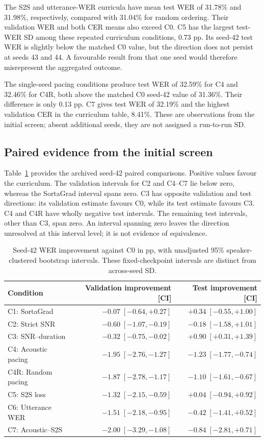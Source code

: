 \documentclass[12pt,a4paper]{report}
\begin{document}
The S2S and utterance-WER curricula have mean test WER of 31.78\% and 31.98\%, respectively, compared with 31.04\% for random ordering. Their validation WER and both CER means also exceed C0. C5 has the largest test-WER SD among these repeated curriculum conditions, 0.73 pp. Its seed-42 test WER is slightly below the matched C0 value, but the direction does not persist at seeds 43 and 44. A favourable result from that one seed would therefore misrepresent the aggregated outcome.

The single-seed pacing conditions produce test WER of 32.59\% for C4 and 32.46\% for C4R, both above the matched C0 seed-42 value of 31.36\%. Their difference is only 0.13 pp. C7 gives test WER of 32.19\% and the highest validation CER in the curriculum table, 8.41\%. These are observations from the initial screen; absent additional seeds, they are not assigned a run-to-run SD.

\subsection{Paired evidence from the initial screen}

Table~\ref{tab:results-bootstrap} provides the archived seed-42 paired comparisons. Positive values favour the curriculum. The validation intervals for C2 and C4--C7 lie below zero, whereas the SortaGrad interval spans zero. C3 has opposite validation and test directions: its validation estimate favours C0, while its test estimate favours C3. C4 and C4R have wholly negative test intervals. The remaining test intervals, other than C3, span zero. An interval spanning zero leaves the direction unresolved at this interval level; it is not evidence of equivalence.

\begin{table}[htbp]\centering\small
\caption{Seed-42 WER improvement against C0 in pp, with unadjusted 95\% speaker-clustered bootstrap intervals. These fixed-checkpoint intervals are distinct from across-seed SD.}\label{tab:results-bootstrap}
\begin{tabular}{lrr}\toprule
Condition & Validation improvement [CI] & Test improvement [CI]\\\midrule
C1: SortaGrad & $-0.07\;[-0.64, +0.27]$ & $+0.34\;[-0.55, +1.00]$ \\
C2: Strict SNR & $-0.60\;[-1.07, -0.19]$ & $-0.18\;[-1.58, +1.01]$ \\
C3: SNR--duration & $-0.32\;[-0.75, -0.02]$ & $+0.90\;[+0.31, +1.39]$ \\
C4: Acoustic pacing & $-1.95\;[-2.76, -1.27]$ & $-1.23\;[-1.77, -0.74]$ \\
C4R: Random pacing & $-1.87\;[-2.78, -1.17]$ & $-1.10\;[-1.61, -0.67]$ \\
C5: S2S loss & $-1.32\;[-2.15, -0.59]$ & $+0.04\;[-0.94, +0.92]$ \\
C6: Utterance WER & $-1.51\;[-2.18, -0.95]$ & $-0.42\;[-1.41, +0.52]$ \\
C7: Acoustic--S2S & $-2.00\;[-3.29, -1.08]$ & $-0.84\;[-2.81, +0.71]$ \\
\bottomrule\end{tabular}\end{table}
\end{document}
